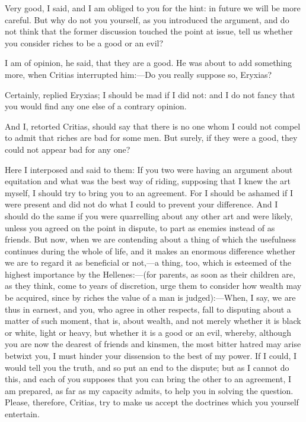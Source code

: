 \documentclass[11pt,letter]{article}
\begin{document}
\par  Very good, I said, and I am obliged to you for the hint: in future we will be more careful. But why do not you yourself, as you introduced the argument, and do not think that the former discussion touched the point at issue, tell us whether you consider riches to be a good or an evil?

\par  I am of opinion, he said, that they are a good. He was about to add something more, when Critias interrupted him:—Do you really suppose so, Eryxias?

\par  Certainly, replied Eryxias; I should be mad if I did not: and I do not fancy that you would find any one else of a contrary opinion.

\par  And I, retorted Critias, should say that there is no one whom I could not compel to admit that riches are bad for some men. But surely, if they were a good, they could not appear bad for any one?

\par  Here I interposed and said to them: If you two were having an argument about equitation and what was the best way of riding, supposing that I knew the art myself, I should try to bring you to an agreement. For I should be ashamed if I were present and did not do what I could to prevent your difference. And I should do the same if you were quarrelling about any other art and were likely, unless you agreed on the point in dispute, to part as enemies instead of as friends. But now, when we are contending about a thing of which the usefulness continues during the whole of life, and it makes an enormous difference whether we are to regard it as beneficial or not,—a thing, too, which is esteemed of the highest importance by the Hellenes:—(for parents, as soon as their children are, as they think, come to years of discretion, urge them to consider how wealth may be acquired, since by riches the value of a man is judged):—When, I say, we are thus in earnest, and you, who agree in other respects, fall to disputing about a matter of such moment, that is, about wealth, and not merely whether it is black or white, light or heavy, but whether it is a good or an evil, whereby, although you are now the dearest of friends and kinsmen, the most bitter hatred may arise betwixt you, I must hinder your dissension to the best of my power. If I could, I would tell you the truth, and so put an end to the dispute; but as I cannot do this, and each of you supposes that you can bring the other to an agreement, I am prepared, as far as my capacity admits, to help you in solving the question. Please, therefore, Critias, try to make us accept the doctrines which you yourself entertain.
\end{document}
